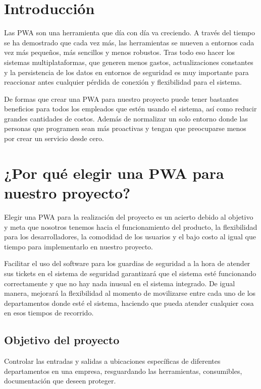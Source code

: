 \documentclass{article}
\begin{document}
\section*{Introducción}
Las PWA son una herramienta que día con día va creciendo. A través del tiempo se ha demostrado que cada vez más, las herramientas se mueven a entornos cada vez más pequeños, más sencillos y menos robustos. Tras todo eso hacer los sistemas multiplataformas, que generen menos gastos, actualizaciones constantes y la persistencia de los datos en entornos de seguridad es muy importante para reaccionar antes cualquier pérdida de conexión y flexibilidad para el sistema.

De formas que crear una PWA para nuestro proyecto puede tener bastantes beneficios para todos los empleados que estén usando el sistema, así como reducir grandes cantidades de costos. Además de normalizar un solo entorno donde las personas que programen sean más proactivas y tengan que preocuparse menos por crear un servicio desde cero.

\clearpage

\section*{¿Por qué elegir una PWA para nuestro proyecto?}
Elegir una PWA para la realización del proyecto es un acierto debido al objetivo y meta que nosotros tenemos hacia el funcionamiento del producto, la flexibilidad para los desarrolladores, la comodidad de los usuarios y el bajo costo al igual que tiempo para implementarlo en nuestro proyecto.

Facilitar el uso del software para los guardias de seguridad a la hora de atender sus tickets en el sistema de seguridad garantizará que el sistema esté funcionando correctamente y que no hay nada inusual en el sistema integrado. De igual manera, mejorará la flexibilidad al momento de movilizarse entre cada uno de los departamentos donde esté el sistema, haciendo que pueda atender cualquier cosa en esos tiempos de recorrido.

\subsection*{Objetivo del proyecto}
Controlar las entradas y salidas a ubicaciones específicas de diferentes departamentos en una empresa, resguardando las herramientas, consumibles, documentación que deseen proteger.

\end{document}

